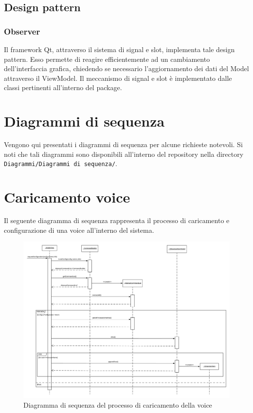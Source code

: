 \documentclass[openany,12pt,a4paper]{report}
\begin{document}
	\subsection{Design pattern}
	
	\subsubsection{Observer}
	Il framework Qt, attraverso il sistema di signal e slot, implementa tale design pattern. Esso permette di reagire efficientemente ad un cambiamento dell'interfaccia grafica, chiedendo se necessario l'aggiornamento dei dati del Model attraverso il ViewModel. Il meccanismo di signal e slot è implementato dalle classi pertinenti all'interno del package.  

	\section{Diagrammi di sequenza}
	
	Vengono qui presentati i diagrammi di sequenza per alcune richieste notevoli. Si noti che tali diagrammi sono disponibili all'interno del repository nella directory \verb|Diagrammi/Diagrammi di sequenza/|.
	
	\section{Caricamento voice}
	
	Il seguente diagramma di sequenza rappresenta il processo di caricamento e configurazione di una voice all'interno del sistema. 
	
	\begin{figure}[H]
		\includegraphics[scale=0.43]{CaricamentoVoice}
		\centering
		\caption{Diagramma di sequenza del processo di caricamento della voice}
	\end{figure}
	
\end{document}
